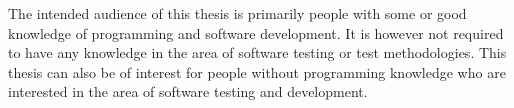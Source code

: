 The intended audience of this thesis is primarily people with some or
good knowledge of programming and software development. It is however
not required to have any knowledge in the area of software testing or
test methodologies. This thesis can also be of interest for people
without programming knowledge who are interested in the area of
software testing and development.\\
